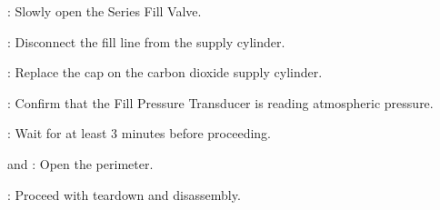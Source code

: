 \begin{checklist}
    \item \primary{}: Slowly open the Series Fill Valve.
    \item \primary{}: Disconnect the fill line from the supply cylinder.
    \item \primary{}: Replace the cap on the carbon dioxide supply cylinder.
    \item \daq{}: Confirm that the Fill Pressure Transducer is reading atmospheric pressure.
    \item \ops{}: Wait for at least 3 minutes before proceeding.
    \item \peri{} and \perii{}: Open the perimeter.
    \item \ops{}: Proceed with teardown and disassembly.

\end{checklist}


